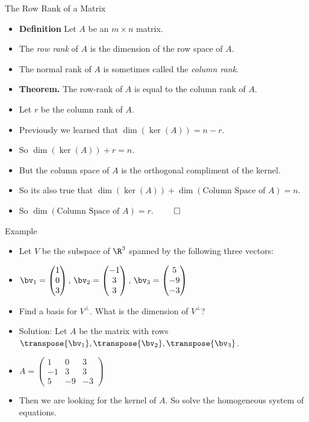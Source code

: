 \documentclass{beamer}
\begin{document}
\begin{frame}{The Row Rank of a Matrix}
\begin{itemize}
\item \textbf{Definition} Let $A$ be an $m\times n$ matrix.
\item The \emph{row rank} of $A$ is the dimension of the row space of $A$.
\item The normal rank of $A$ is sometimes called the \emph{column rank}.
\item \textbf{Theorem.} The row-rank of $A$ is equal to the column rank of $A$.
\item Let $r$ be the column rank of $A$.
\item Previously we learned that $\dim(\ker(A)) = n  - r$.
\item So $\dim(\ker(A)) + r = n$.
\item But the column space of $A$ is the orthogonal compliment of the kernel.
\item So its also true that $\dim(\ker(A)) + \dim(\text{Column Space of $A$}) = n$.
\item So $\dim(\text{Column Space of $A$}) = r$. $\qed$
\end{itemize}
\end{frame}

\begin{frame}{Example}
\begin{itemize}
\item Let $V$ be the subspace of $\R^3$ spanned by the following three vectors:
\item $\bv_1=
\begin{pmatrix}
1  \\
0  \\
3   \\
\end{pmatrix}
\text{, }
\bv_2=
\begin{pmatrix}
-1 \\
3\\
3 \\
\end{pmatrix}
\text{, }
\bv_3=
\begin{pmatrix}
5 \\
-9 \\
-3 \\
\end{pmatrix}
$
\item Find a basis for $V^{\perp}$. What is the dimension of $V^{\perp}$?
\item Solution: Let $A$ be the matrix with rows $\transpose{\bv_1}, \transpose{\bv_2}, \transpose{\bv_3}$.
\item $A=
\begin{pmatrix}
1 & 0 & 3   \\
-1 & 3 & 3  \\
5 & -9 & -3
\end{pmatrix}
$
\item Then we are looking for the kernel of $A$. So solve the homogeneous system of equations.
\end{itemize}
\end{frame}
\end{document}
